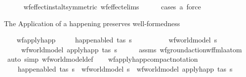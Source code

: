\begin{isabellebody}
%
\isadelimproof
\ \ \ \ %
\endisadelimproof
%
\isatagproof
{}\isamarkupfalse%
\ wf{\isacharunderscore}{\kern0pt}effect{\isacharunderscore}{\kern0pt}inst{\isacharunderscore}{\kern0pt}alt{\isacharbrackleft}{\kern0pt}symmetric{\isacharbrackright}{\kern0pt}\ wf{\isacharunderscore}{\kern0pt}effect{\isachardot}{\kern0pt}elims{\isacharparenleft}{\kern0pt}{}{\isacharparenright}{\kern0pt}\isanewline
\ \ \ \ \isamarkupfalse%
\ {\isacharparenleft}{\kern0pt}cases\ a{\isacharparenright}{\kern0pt}\ force%
\endisatagproof
{\isafoldproof}%
%
\isadelimproof
%
\endisadelimproof
%
\begin{isamarkuptext}%
The Application of a happening preserves well-formedness%
\end{isamarkuptext}\isamarkuptrue%
\ \ \isamarkupfalse%
\ wf{\isacharunderscore}{\kern0pt}apply{\isacharunderscore}{\kern0pt}happ{\isacharcolon}{\kern0pt}\isanewline
\ \ \ \ \ {\isachardoublequoteopen}happ{\isacharunderscore}{\kern0pt}enabled\ {\isacharparenleft}{\kern0pt}t{\isacharcomma}{\kern0pt}as{\isacharparenright}{\kern0pt}\ s{\isachardoublequoteclose}\ \isanewline
\ \ \ \ \ \ \ \ \ {\isachardoublequoteopen}wf{\isacharunderscore}{\kern0pt}world{\isacharunderscore}{\kern0pt}model\ s{\isachardoublequoteclose}\isanewline
\ \ \ \ \ {\isachardoublequoteopen}wf{\isacharunderscore}{\kern0pt}world{\isacharunderscore}{\kern0pt}model\ {\isacharparenleft}{\kern0pt}apply{\isacharunderscore}{\kern0pt}happ\ {\isacharparenleft}{\kern0pt}t{\isacharcomma}{\kern0pt}as{\isacharparenright}{\kern0pt}\ s{\isacharparenright}{\kern0pt}{\isachardoublequoteclose}\isanewline
%
\isadelimproof
\ \ \ \ %
\endisadelimproof
%
\isatagproof
{}\isamarkupfalse%
\ assms\ wf{\isacharunderscore}{\kern0pt}ground{\isacharunderscore}{\kern0pt}action{\isacharunderscore}{\kern0pt}wf{\isacharunderscore}{\kern0pt}fmla{\isacharunderscore}{\kern0pt}atom\ \isamarkupfalse%
\ {\isacharparenleft}{\kern0pt}auto\ simp{\isacharcolon}{\kern0pt}\ wf{\isacharunderscore}{\kern0pt}world{\isacharunderscore}{\kern0pt}model{\isacharunderscore}{\kern0pt}def{\isacharparenright}{\kern0pt}%
\endisatagproof
{\isafoldproof}%
%
\isadelimproof
\isanewline
%
\endisadelimproof
\isanewline
\ \ \isamarkupfalse%
\ wf{\isacharunderscore}{\kern0pt}apply{\isacharunderscore}{\kern0pt}happ{\isacharunderscore}{\kern0pt}compact{\isacharunderscore}{\kern0pt}notation{\isacharcolon}{\kern0pt}\isanewline
\ \ \ \ {\isachardoublequoteopen}happ{\isacharunderscore}{\kern0pt}enabled\ {\isacharparenleft}{\kern0pt}t{\isacharcomma}{\kern0pt}as{\isacharparenright}{\kern0pt}\ s\ {\isasymLongrightarrow}\ wf{\isacharunderscore}{\kern0pt}world{\isacharunderscore}{\kern0pt}model\ s\ {\isasymLongrightarrow}\ wf{\isacharunderscore}{\kern0pt}world{\isacharunderscore}{\kern0pt}model\ {\isacharparenleft}{\kern0pt}apply{\isacharunderscore}{\kern0pt}happ\ {\isacharparenleft}{\kern0pt}t{\isacharcomma}{\kern0pt}as{\isacharparenright}{\kern0pt}\ s{\isacharparenright}{\kern0pt}{\isachardoublequoteclose}\isanewline

\end{isabellebody}
